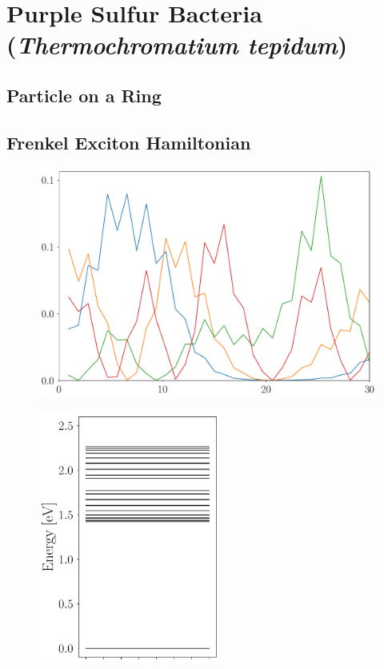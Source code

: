\documentclass[9pt]{report}
\begin{document}
\newpage
\section{Purple Sulfur Bacteria (\textit{Thermochromatium tepidum})}


\subsection{Particle on a Ring}

\subsection{Frenkel Exciton Hamiltonian}

\begin{figure}[H]
	\centering
	\includegraphics[width=\textwidth]{LHC_Eigenstates.pdf}
\end{figure}
\begin{figure}[H]
	\centering
	\includegraphics[width=6cm]{Purple_Bacteria_LHC_S0.pdf}
\end{figure}
\end{document}
